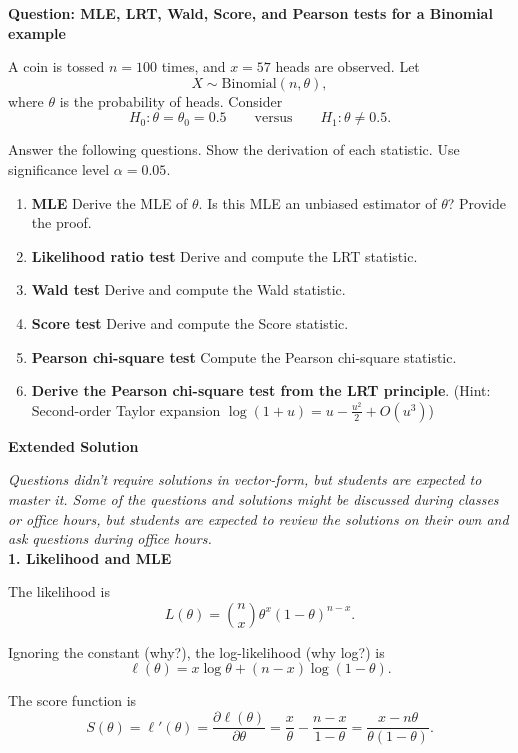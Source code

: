 \documentclass[12pt]{article}
\begin{document}
\centerline{\bf{Question: MLE, LRT, Wald, Score, and Pearson tests for a Binomial example}}

A coin is tossed $n=100$ times, and $x=57$ heads are observed. Let
\[
X\sim \mathrm{Binomial}(n,\theta),
\]
where $\theta$ is the probability of heads. Consider
\[
H_0:\theta=\theta_0=0.5
\qquad \text{versus} \qquad
H_1:\theta\neq 0.5.
\]

Answer the following questions. 
Show the derivation of each statistic. Use significance level $\alpha=0.05$.

\begin{enumerate}[label=\textbf{(\alph*)}, leftmargin=1.2cm]
\item \textbf{MLE} Derive the MLE of $\theta$. Is this MLE an unbiased estimator of $\theta$? Provide the proof. 
\item \textbf{Likelihood ratio test} Derive and compute the LRT statistic.
\item \textbf{Wald test} Derive and compute the Wald statistic. 
\item \textbf{Score test} Derive and compute the Score statistic. 
\item \textbf{Pearson chi-square test} Compute the Pearson chi-square statistic.
\item \textbf{Derive the Pearson chi-square test from the LRT principle}. (Hint: Second-order Taylor expansion $\log(1+u)=u-\frac{u^2}{2}+O(u^3)$)


\end{enumerate}

\newpage

\centerline{\bf{Extended Solution}}
\smallskip

{\it Questions didn't require solutions in vector-form, but students are expected to master it. Some of the questions and solutions might be discussed during classes or office hours, but students are expected to review the solutions on their own and ask questions during office hours.} \\

{\bf 1. Likelihood and MLE}

The likelihood is
\[
L(\theta)=\binom{n}{x}\theta^x(1-\theta)^{n-x}.
\]

Ignoring the constant (why?), the log-likelihood (why log?) is
\[
\ell(\theta)=x\log\theta+(n-x)\log(1-\theta).
\]

The score function is
\[
S(\theta)=\ell'(\theta)=\frac{\partial \ell(\theta)}{\partial \theta}
=\frac{x}{\theta}-\frac{n-x}{1-\theta}
=\frac{x-n\theta}{\theta(1-\theta)}.
\]
\end{document}
